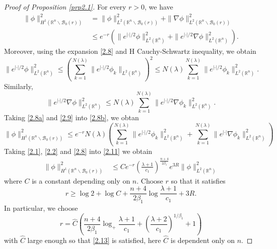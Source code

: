 \documentclass{article}
\numberwithin{equation}{section}
\newcommand\R{\ensuremath{\mathbb{R}}}
\numberwithin{equation}{section}
\theoremstyle{definition}
\begin{document}
\begin{proof}[Proof of Proposition \ref{prp2.1}]
	For every $r>0$, we have
	\begin{equation}\label{2.8b}
		\begin{aligned}
			\|\phi\|^2_{H^{1}\left( \R^{n}\backslash \mathcal{B}_0(r) \right) }&= \|\phi\|^2_{L^2\left( \R^{n}\backslash \mathcal{B}_0(r) \right) }+\|\nabla \phi\|^2_{L^2\left( \R^{n}\backslash \mathcal{B}_0(r) \right) }\\
										   &\le e^{-r}\left( \|e^{|\cdot | /2}\phi\|^2_{L^2\left( \R^{n} \right) }+\|e^{|\cdot | /2}\nabla \phi\|^2_{L^2\left( \R^{n} \right) } \right). 
		\end{aligned} 
	\end{equation}
	Moreover, using the expansion \eqref{2.8} and H Cauchy-Schwartz inequality, we obtain
	\begin{equation}\label{2.8a}
		\|e^{|\cdot | /2}\phi\|^2_{L^2(\R^{n})}\le \left( \sum_{k=1}^{N(\lambda)} \|e^{|\cdot | /2}\phi_k\|_{L^2(\R^{n})} \right) ^2\le N(\lambda) \sum_{k=1}^{N(\lambda)} \|e^{|\cdot | /2}\phi_k\|^2_{L^2\left( \R^{n} \right) }. 
	\end{equation}
Similarly,
\begin{equation}\label{2.9}
	\|e^{|\cdot | /2}\nabla \phi\|^2_{L^2\left( \R^{n} \right) }\le N(\lambda)\sum_{k=1}^{N(\lambda)} \|e^{|\cdot | /2}\nabla \phi_k\|^2_{L^2(\R^{n})}.
\end{equation}
Taking \eqref{2.8a} and \eqref{2.9} into \eqref{2.8b}, we obtan
\begin{equation}\label{2.11}
	\|\phi\|^2_{H^{1}(\R^{n}\backslash  \mathcal{B}_0(r))} \le e^{-r}N(\lambda) \left( \sum_{k=1}^{N(\lambda)} \|e^{|\cdot | /2}\phi_k\|^2_{L^2(\R^{n})}+\sum_{k=1}^{N(\lambda)} \|e^{|\cdot |}\nabla \phi_k\|^2_{L^2(\R^{n})} \right) 
\end{equation}
Taking \eqref{2.1}, \eqref{2.2} and \eqref{2.8} into \eqref{2.11} we obtain
\begin{equation}
	\begin{aligned}
		\|\phi\|^2_{H^{1}(\R^{n}\backslash \mathcal{B}_0(r))}&\le C e^{-r} \left( \frac{\lambda+1}{c_1} \right) ^{ \frac{n+4}{2\beta_1}} e^{3R} \|\phi\|_{L^2\left( \R^{n} \right) }^2 
	\end{aligned} 
\end{equation}
where $C$ is a constant depending only on $n$.
Choose $r$ so that it satisfies
\begin{equation}\label{2.13}
	r \ge \log 2 + \log C + \frac{n+4}{2\beta_1}\log \frac{\lambda+1}{c_1}+3R.
\end{equation}
In particular, we choose
\begin{equation}\label{2.16}
	r= \hat{C}\left( \frac{n+4}{2\beta_1} \log_+ \frac{\lambda+1}{c_1}+ \left( \frac{\lambda+2}{c_1} \right) ^{1 /\beta_1}+1\right) 
\end{equation}
with $\hat{C}$ large enough so that  \eqref{2.13} is satisfied, here $\hat{C}$ is dependent only on $n$.
\end{proof}
\end{document}
